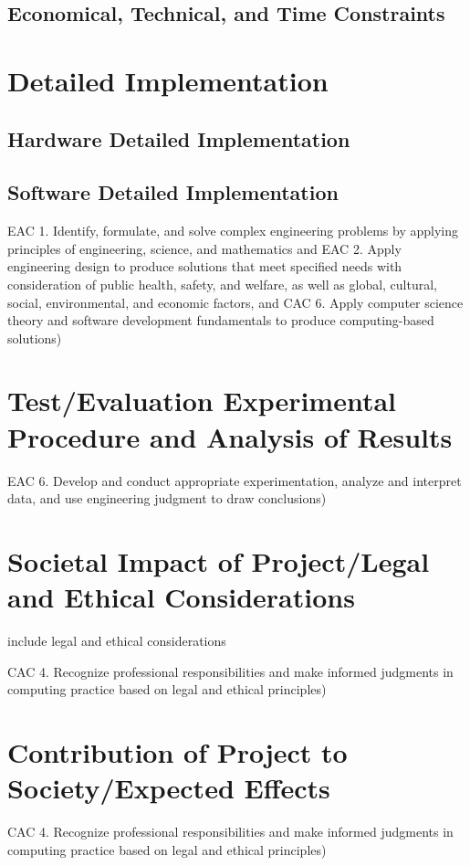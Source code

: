 \documentclass{article}
\begin{document}
\subsection{Economical, Technical, and Time Constraints}  

\section{Detailed Implementation} 

\subsection{Hardware Detailed Implementation}

\subsection{Software Detailed Implementation}
EAC 1. Identify, formulate, and solve complex engineering problems by 
applying principles of engineering, science, and mathematics and EAC 2. 
Apply engineering design to produce solutions that meet specified needs with 
consideration of public health, safety, and welfare, as well as global, cultural, 
social, environmental, and economic factors, and CAC 6. Apply computer 
science theory and software development fundamentals to produce 
computing-based solutions) 

\section{Test/Evaluation Experimental Procedure and Analysis of Results} 
EAC 6. Develop and conduct appropriate experimentation, analyze and interpret 
data, and use engineering judgment to draw conclusions) 

\section{Societal Impact of Project\slash Legal and Ethical Considerations} 
include legal and ethical considerations 

CAC 4. Recognize professional responsibilities and make informed judgments in 
computing practice based on legal and ethical principles) 

\section{Contribution of Project to Society\slash Expected Effects}
CAC 4. Recognize professional responsibilities and make informed judgments in 
computing practice based on legal and ethical principles) 
\end{document}
